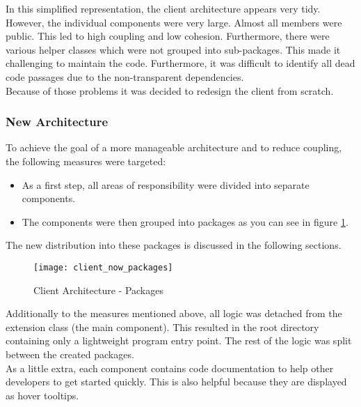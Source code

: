 In this simplified representation, the client architecture appears very tidy.
However, the individual components were very large.
Almost all members were public.
This led to high coupling and low cohesion.
Furthermore, there were various helper classes which were not grouped into sub-packages.
This made it challenging to maintain the code.
Furthermore, it was difficult to identify all dead code passages due to the non-transparent dependencies.\\

Because of those problems it was decided to redesign the client from scratch.

\subsubsection{New Architecture}
To achieve the goal of a more manageable architecture and to reduce coupling, the following measures were targeted:
\begin{itemize}
    \item As a first step, all areas of responsibility were divided into separate components.
    \item The components were then grouped into packages as you can see in figure \ref{fig:client_now_packages}.
\end{itemize}
The new distribution into these packages is discussed in the following sections.\\

\begin{figure}[H]
    \centering
    \texttt{[image: client\_now\_packages]}
    \caption{Client Architecture - Packages}
    \label{fig:client_now_packages}
\end{figure}


Additionally to the measures mentioned above, all logic was detached from the extension class (the main component).
This resulted in the root directory containing only a lightweight program entry point.
The rest of the logic was split between the created packages.\\

As a little extra, each component contains code documentation to help other developers to get started quickly.
This is also helpful because they are displayed as hover tooltips.


